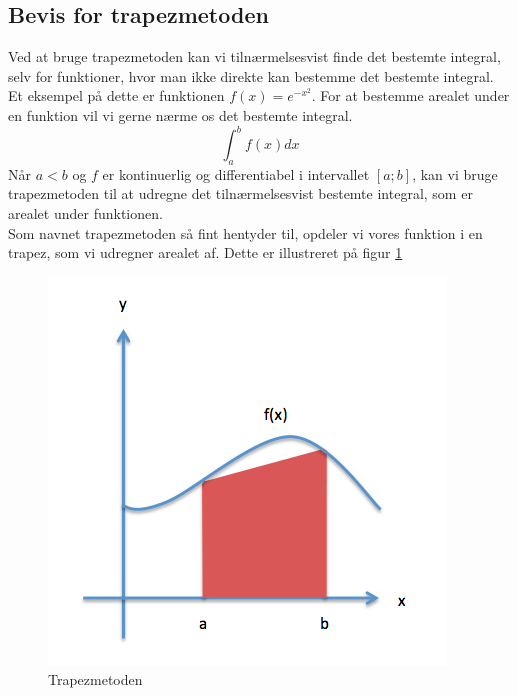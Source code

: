 \documentclass[12pt]{article}
\numberwithin{equation}{section}
\begin{document}
\subsection{Bevis for trapezmetoden}
Ved at bruge trapezmetoden kan vi tilnærmelsesvist finde det bestemte integral, selv for funktioner, hvor man ikke direkte kan bestemme det bestemte integral. Et eksempel på dette er funktionen $f(x)=e^{-x^{2}}$.
For at bestemme arealet under en funktion vil vi gerne nærme os det bestemte integral.
\begin{equation}
\int_{a}^{b}f(x)dx \nonumber
\end{equation}
Når $a<b$ og $f$ er kontinuerlig og differentiabel i intervallet $[a;b]$, kan vi bruge trapezmetoden til at udregne det tilnærmelsesvist bestemte integral, som er arealet under funktionen.\\
Som navnet trapezmetoden så fint hentyder til, opdeler vi vores funktion i en trapez, som vi udregner arealet af. Dette er illustreret på figur \ref{fig:trapezmetoden}
\begin{figure}[tbph]
\centering
\includegraphics[scale=0.5]{Billeder/trapezmetoden.png}
\caption{Trapezmetoden}
\label{fig:trapezmetoden}
\end{figure}
\end{document}
